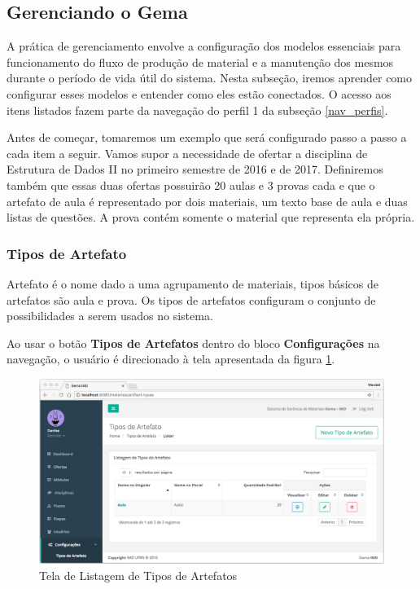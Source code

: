 
\subsection{Gerenciando o Gema}\label{managingTheSystem}

A prática de gerenciamento envolve a configuração dos modelos essenciais para funcionamento do fluxo de produção de material e a manutenção dos mesmos durante o período de vida útil do sistema. Nesta subseção, iremos aprender como configurar esses modelos e entender como eles estão conectados. O acesso aos itens listados fazem parte da navegação do perfil 1 da subseção \hyperref[nav_perfis]{\ref{nav_perfis}}.

Antes de começar, tomaremos um exemplo que será configurado passo a passo a cada item a seguir. Vamos supor a necessidade de ofertar a disciplina de Estrutura de Dados II no primeiro semestre de 2016 e de 2017. Definiremos também que essas duas ofertas possuirão 20 aulas e 3 provas cada e que o artefato de aula é representado por dois materiais, um texto base de aula e duas listas de questões. A prova contém somente o material que representa ela própria.

\subsubsection{Tipos de Artefato}\label{artifactTypes}

Artefato é o nome dado a uma agrupamento de materiais, tipos básicos de artefatos são aula e prova. Os tipos de artefatos configuram o conjunto de possibilidades a serem usados no sistema.

Ao usar o botão \textbf{Tipos de Artefatos} dentro do bloco \textbf{Configurações} na navegação, o usuário é direcionado à tela apresentada da figura \hyperref[fig:sc_artifact_types_list]{\ref{fig:sc_artifact_types_list}}.

\begin{figure}[H]
\centering
     \includegraphics[width=1.0\textwidth]{Screens/ArtifactTypesList.png}
      \caption{Tela de Listagem de Tipos de Artefatos}
       \label{fig:sc_artifact_types_list}
\end{figure}


